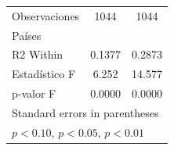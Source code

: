 \begin{table}[htbp]
\begin{tabular}{l*{2}{c}}
\midrule
Observaciones       &        1044         &        1044         \\
Países              &                     &                     \\
R2 Within           &      0.1377         &      0.2873         \\
Estadístico F       &       6.252         &      14.577         \\
p-valor F           &      0.0000         &      0.0000         \\
\bottomrule
\multicolumn{3}{l}{\footnotesize Standard errors in parentheses}\\
\multicolumn{3}{l}{\footnotesize \sym{*} \(p<0.10\), \sym{**} \(p<0.05\), \sym{***} \(p<0.01\)}\\
\end{tabular}
\end{table}

